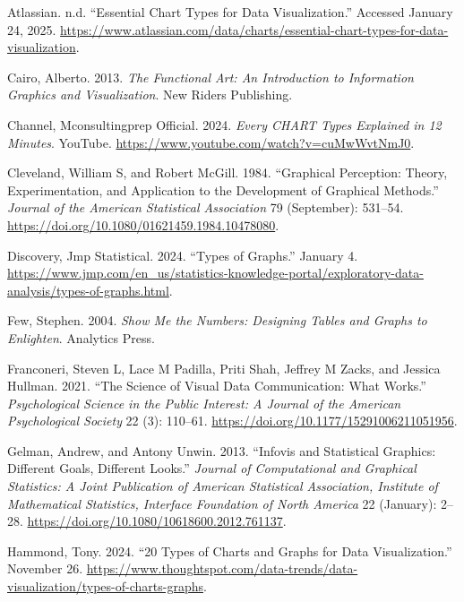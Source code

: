 \documentclass[
  letterpaper,
  DIV=11,
  numbers=noendperiod]{scrartcl}
\newlength{\cslhangindent}
\newenvironment{CSLReferences}[2] %
 {\begin{list}{}{%
  \setlength{\itemindent}{0pt}
  \setlength{\leftmargin}{0pt}
  \setlength{\parsep}{0pt}
  \ifodd #1
   \setlength{\leftmargin}{\cslhangindent}
   \setlength{\itemindent}{-1\cslhangindent}
  \fi
  \setlength{\itemsep}{#2\baselineskip}}}
 {\end{list}}
\begin{document}
\protect{}\label{refs}
\begin{CSLReferences}{1}{1}
Atlassian. n.d. {``Essential Chart Types for Data Visualization.''}
Accessed January 24, 2025.
\url{https://www.atlassian.com/data/charts/essential-chart-types-for-data-visualization}.

Cairo, Alberto. 2013. \emph{The Functional Art: An Introduction to
Information Graphics and Visualization}. New Riders Publishing.

Channel, Mconsultingprep Official. 2024. \emph{Every {CHART} Types
Explained in 12 Minutes}. You{T}ube.
\url{https://www.youtube.com/watch?v=cuMwWvtNmJ0}.

Cleveland, William S, and Robert McGill. 1984. {``Graphical Perception:
Theory, Experimentation, and Application to the Development of Graphical
Methods.''} \emph{Journal of the American Statistical Association} 79
(September): 531--54.
\url{https://doi.org/10.1080/01621459.1984.10478080}.

Discovery, Jmp Statistical. 2024. {``Types of Graphs.''} January 4.
\url{https://www.jmp.com/en_us/statistics-knowledge-portal/exploratory-data-analysis/types-of-graphs.html}.

Few, Stephen. 2004. \emph{Show Me the Numbers: Designing Tables and
Graphs to Enlighten}. Analytics Press.

Franconeri, Steven L, Lace M Padilla, Priti Shah, Jeffrey M Zacks, and
Jessica Hullman. 2021. {``The Science of Visual Data Communication: What
Works.''} \emph{Psychological Science in the Public Interest: A Journal
of the American Psychological Society} 22 (3): 110--61.
\url{https://doi.org/10.1177/15291006211051956}.

Gelman, Andrew, and Antony Unwin. 2013. {``Infovis and Statistical
Graphics: Different Goals, Different Looks.''} \emph{Journal of
Computational and Graphical Statistics: A Joint Publication of American
Statistical Association, Institute of Mathematical Statistics, Interface
Foundation of North America} 22 (January): 2--28.
\url{https://doi.org/10.1080/10618600.2012.761137}.

Hammond, Tony. 2024. {``20 Types of Charts and Graphs for Data
Visualization.''} November 26.
\url{https://www.thoughtspot.com/data-trends/data-visualization/types-of-charts-graphs}.


\end{CSLReferences}
\end{document}
